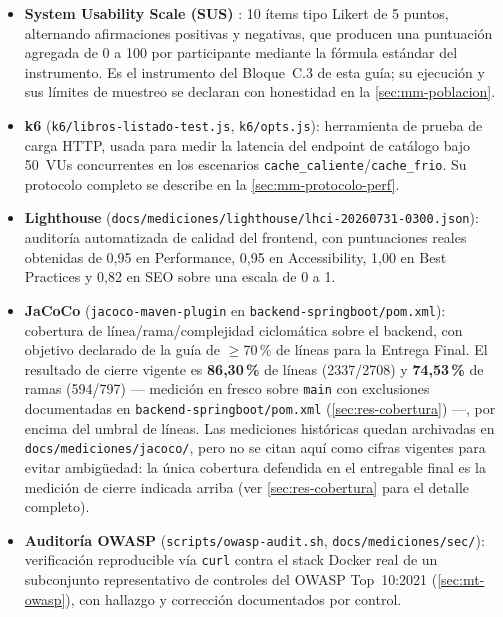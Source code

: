 \begin{itemize}[leftmargin=1.2cm]
  \item \textbf{System Usability Scale (SUS)} \citep{brooke1996sus}: 10
    ítems tipo Likert de 5 puntos, alternando afirmaciones positivas y
    negativas, que producen una puntuación agregada de 0 a 100 por
    participante mediante la fórmula estándar del instrumento. Es el
    instrumento del Bloque~C.3 de esta guía; su ejecución y sus límites
    de muestreo se declaran con honestidad en la
    \autoref{sec:mm-poblacion}.
  \item \textbf{k6} (\texttt{k6/libros-listado-test.js},
    \texttt{k6/opts.js}): herramienta de prueba de carga HTTP, usada para
    medir la latencia del endpoint de catálogo bajo 50~VUs concurrentes
    en los escenarios \texttt{cache\_caliente}/\texttt{cache\_frio}. Su
    protocolo completo se describe en la \autoref{sec:mm-protocolo-perf}.
  \item \textbf{Lighthouse} (\texttt{docs/mediciones/lighthouse/lhci-20260731-0300.json}):
    auditoría automatizada de calidad del frontend, con puntuaciones
    reales obtenidas de 0,95 en Performance, 0,95 en Accessibility, 1,00
    en Best Practices y 0,82 en SEO sobre una escala de 0 a 1.
  \item \textbf{JaCoCo} (\texttt{jacoco-maven-plugin} en
    \texttt{backend-springboot/pom.xml}): cobertura de línea/rama/complejidad
    ciclomática sobre el backend, con objetivo declarado de la guía de
    $\geq$70\,\% de líneas para la Entrega Final. El resultado de cierre
    vigente es \textbf{86,30\,\%} de líneas (2337/2708) y \textbf{74,53\,\%}
    de ramas (594/797) — medición en fresco sobre
    \texttt{main} con exclusiones documentadas en
    \texttt{backend-springboot/pom.xml} (\autoref{sec:res-cobertura}) —, por encima del
    umbral de líneas. Las mediciones históricas quedan archivadas en
    \texttt{docs/mediciones/jacoco/}, pero no se citan aquí como cifras
    vigentes para evitar ambigüedad: la única cobertura defendida en el
    entregable final es la medición de cierre indicada arriba (ver
    \autoref{sec:res-cobertura} para el detalle completo).
  \item \textbf{Auditoría OWASP} (\texttt{scripts/owasp-audit.sh},
    \texttt{docs/mediciones/sec/}): verificación reproducible vía
    \texttt{curl} contra el stack Docker real de un subconjunto
    representativo de controles del OWASP Top~10:2021
    (\autoref{sec:mt-owasp}), con hallazgo y corrección documentados por
    control.
\end{itemize}

